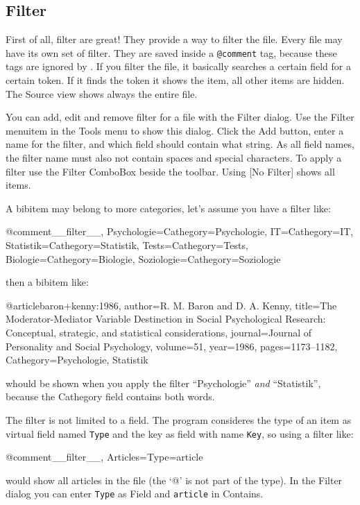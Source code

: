 \documentclass[oneside,10pt]{article}
\newcommand{\command}[1]{\textsf{#1}}
\begin{document}
\subsection{Filter}
\label{sec:Filter}

First of all, filter are great! They provide a way to filter the file. Every file may have its
own set of filter. They are saved inside a \verb|@comment| tag, because these tags are
ignored by \BibTeX{}. If you filter the file, it basically searches a certain field
for a certain token. If it finds the token it shows the item, all other items are
hidden. The Source view shows always the entire file.

You can add, edit and remove filter for a file with the Filter dialog.
Use the Filter menuitem in the Tools menu to show this dialog. Click the Add button,
enter a name for the filter, and which field should contain what string. As all
field names, the filter name must also not contain spaces and special characters. To
apply a filter use the Filter ComboBox beside the toolbar. Using \command{[No Filter]}
shows all items.

A bibitem may belong to more categories, let's assume you have a filter like:
\begin{code}
@comment{__filter__,
  Psychologie={Cathegory=Psychologie},
  IT={Cathegory=IT},
  Statistik={Cathegory=Statistik},
  Tests={Cathegory=Tests},
  Biologie={Cathegory=Biologie},
  Soziologie={Cathegory=Soziologie}
}
\end{code}
then a bibitem like:
\begin{code}
@article{baron+kenny:1986,
  author={R. M. Baron and D. A. Kenny},
  title={The Moderator-Mediator Variable Destinction in Social
    Psychological Research: Conceptual, strategic, and statistical
    considerations},
  journal={Journal of Personality and Social Psychology},
  volume={51},
  year={1986},
  pages={1173--1182},
  Cathegory={Psychologie, Statistik}
}
\end{code}
whould be shown when you apply the filter ``Psychologie'' \emph{and} ``Statistik'',
because the Cathegory field contains both words.

The filter is not limited to a field. The program consideres the type of an item
as virtual field named \verb|Type| and the key as
field with name \verb|Key|, so using a filter like:
\begin{code}
@comment{__filter__,
  Articles={Type=article}
}
\end{code}
would show all articles in the file (the `@' is not part of the type). In the
Filter dialog you can enter \verb|Type| as Field and \verb|article| in Contains.
\end{document}
